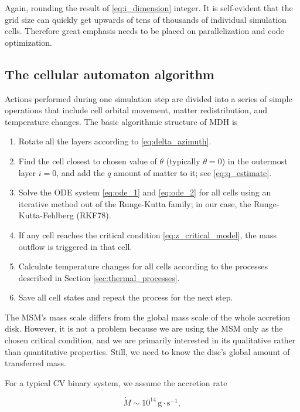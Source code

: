 Again, rounding the result of \eqref{eq:i_dimension} integer. It is self-evident that the grid size can quickly get upwards of tens of thousands of individual simulation cells. Therefore great emphasis needs to be placed on parallelization and code optimization. 

\subsection{The cellular automaton algorithm}

Actions performed during one simulation step are divided into a series of simple operations that include cell orbital movement, matter redistribution, and temperature changes. The basic algorithmic structure of MDH is

\begin{enumerate}
	\item Rotate all the layers according to \eqref{eq:delta_azimuth}.
	\item Find the cell closest to chosen value of $\theta$ (typically $\theta = 0$) in the outermost layer $i = 0$, and add the $q$ amount of matter to it; see \eqref{eq:q_estimate}.
	\item Solve the ODE system \eqref{eq:ode_1} and \eqref{eq:ode_2} for all cells using an iterative method out of the Runge-Kutta family; in our case, the Runge-Kutta-Fehlberg (RKF78).
	\item If any cell reaches the critical condition \eqref{eq:z_critical_model}, the mass outflow is triggered in that cell.
    \item Calculate temperature changes for all cells according to the processes described in Section \ref{sec:thermal_processes}.
	\item Save all cell states and repeat the process for the next step.
\end{enumerate}

The MSM's mass scale differs from the global mass scale of the whole accretion disk. However, it is not a problem because we are using the MSM only as the chosen critical condition, and we are primarily interested in its qualitative rather than quantitative properties. Still, we need to know the disc's global amount of transferred mass.

For a typical CV binary system, we assume the accretion rate \cite{ae_shortrev2015}

\begin{equation}
	\dot{M} \sim 10^{14}\, \mathrm{g \cdot s^{-1}},
\end{equation}

